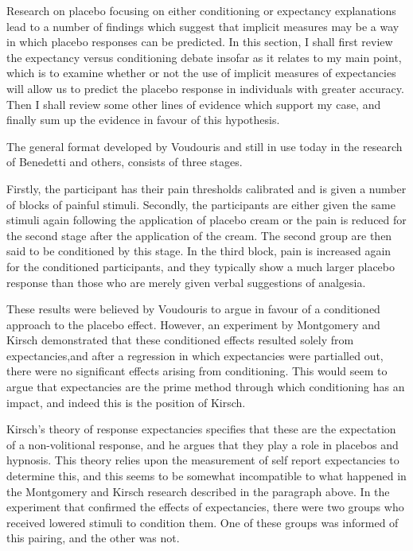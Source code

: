 Research on placebo focusing on either conditioning or expectancy explanations lead to a number of findings which suggest that implicit measures may be a way in which placebo responses can be predicted. In this section, I shall first review the expectancy versus conditioning debate insofar as it relates to my main point, which is to examine whether or not the use of implicit measures of expectancies will allow us to predict the placebo response in individuals with greater accuracy. Then I shall review some other lines of evidence which support my case, and finally sum up the evidence in favour of this hypothesis.

The general format developed by Voudouris and still in use today in the research of Benedetti \cite{Benedetti2006c} and others, consists of three stages. 

Firstly, the participant has their pain thresholds calibrated and is given a number of blocks of painful stimuli. Secondly, the participants are either given the same stimuli again following the application of placebo cream or the pain is reduced for the second stage after the application of the cream. The second group are then said to be conditioned by this stage. In the third block, pain is increased again for the conditioned participants, and they typically show a much larger placebo response than those who are merely given verbal suggestions of analgesia.  

These results were believed by Voudouris to argue in favour of a conditioned approach to the placebo effect. However, an experiment by Montgomery and Kirsch \cite{Montgomery1997} demonstrated that these conditioned effects resulted solely from expectancies,and after a regression in which expectancies were partialled out, there were no significant effects arising from conditioning. This would seem to argue that expectancies are the prime method through which conditioning has an impact, and indeed this is the position of Kirsch. 

Kirsch's \cite{Kirsch1985,Kirsch1997} theory of response expectancies specifies that these are the expectation of a non-volitional response, and he argues that they play a role in placebos and hypnosis. This theory  relies upon the measurement of self report expectancies to determine this, and this seems  to be somewhat incompatible to what happened in the Montgomery and Kirsch research described in the paragraph above. In the experiment that confirmed the effects of expectancies, there were two groups who received lowered stimuli to condition them. One of these groups was informed of this pairing, and the other was not. 

